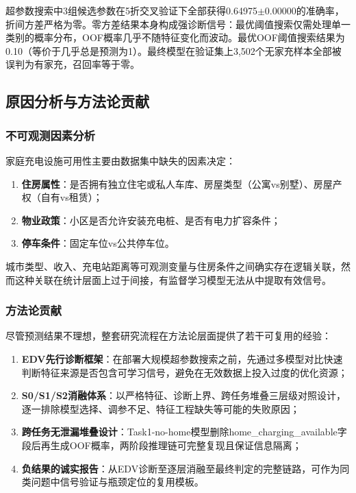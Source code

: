 超参数搜索中3组候选参数在5折交叉验证下全部获得0.64975$\pm$0.00000的准确率，折间方差严格为零。零方差结果本身构成强诊断信号：最优阈值搜索仅需处理单一类别的概率分布，OOF概率几乎不随特征变化而波动。最优OOF阈值搜索结果为0.10（等价于几乎总是预测为1）。最终模型在验证集上3,502个无家充样本全部被误判为有家充，召回率等于零。

\subsection{原因分析与方法论贡献}

\subsubsection{不可观测因素分析}

家庭充电设施可用性主要由数据集中缺失的因素决定：

\begin{enumerate}[itemsep=0pt]
\item \textbf{住房属性}：是否拥有独立住宅或私人车库、房屋类型（公寓vs别墅）、房屋产权（自有vs租赁）；
\item \textbf{物业政策}：小区是否允许安装充电桩、是否有电力扩容条件；
\item \textbf{停车条件}：固定车位vs公共停车位。
\end{enumerate}

城市类型、收入、充电站距离等可观测变量与住房条件之间确实存在逻辑关联，然而这种关联在统计层面上过于间接，有监督学习模型无法从中提取有效信号。

\subsubsection{方法论贡献}

尽管预测结果不理想，整套研究流程在方法论层面提供了若干可复用的经验：

\begin{enumerate}[itemsep=0pt]
\item \textbf{EDV先行诊断框架}：在部署大规模超参数搜索之前，先通过多模型对比快速判断特征来源是否包含可学习信号，避免在无效数据上投入过度的优化资源；
\item \textbf{S0/S1/S2消融体系}：以严格特征、诊断上界、跨任务堆叠三层级对照设计，逐一排除模型选择、调参不足、特征工程缺失等可能的失败原因；
\item \textbf{跨任务无泄漏堆叠设计}：Task1-no-home模型删除home\_charging\_available字段后再生成OOF概率，两阶段推理链可完整复现且保证信息隔离；
\item \textbf{负结果的诚实报告}：从EDV诊断至逐层消融至最终判定的完整链路，可作为同类问题中信号验证与瓶颈定位的复用模板。
\end{enumerate}
